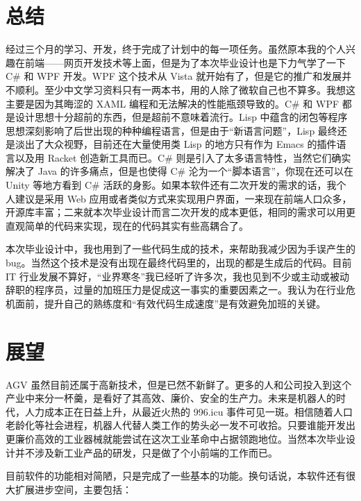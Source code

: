 
\section{总结}

经过三个月的学习、开发，终于完成了计划中的每一项任务。虽然原本我的个人兴趣在前端——网页开发技术等上面，但是为了本次毕业设计也是下力气学了一下 C\# 和 WPF 开发。WPF 这个技术从 Vista 就开始有了，但是它的推广和发展并不顺利。至少中文学习资料只有一两本书，用的人除了微软自己也不算多。我想这主要是因为其晦涩的 XAML 编程和无法解决的性能瓶颈导致的。C\# 和 WPF 都是设计思想十分超前的东西，但是超前不意味着流行。Lisp 中蕴含的闭包等程序思想深刻影响了后世出现的种种编程语言，但是由于``新语言问题''\cite{url:yinwang}，Lisp 最终还是淡出了大众视野，目前还在大量使用类 Lisp 的地方只有作为 Emacs 的插件语言以及用 Racket 创造新工具而已。C\# 则是引入了太多语言特性，当然它们确实解决了 Java 的许多痛点，但是也使得 C\# 沦为一个``脚本语言''，你现在还可以在 Unity 等地方看到 C\# 活跃的身影。如果本软件还有二次开发的需求的话，我个人建议是采用 Web 应用或者类似方式来实现用户界面，一来现在前端人口众多，开源库丰富；二来就本次毕业设计而言二次开发的成本更低，相同的需求可以用更直观简单的代码来实现，现在的代码其实有些高耦合了。

本次毕业设计中，我也用到了一些代码生成的技术，来帮助我减少因为手误产生的 bug。当然这个技术是没有出现在最终代码里的，出现的都是生成后的代码。目前 IT 行业发展不算好，``业界寒冬''我已经听了许多次，我也见到不少或主动或被动辞职的程序员，过量的加班压力是促成这一事实的重要因素之一。我认为在行业危机面前，提升自己的熟练度和``有效代码生成速度''是有效避免加班的关键。

\section{展望}

AGV 虽然目前还属于高新技术，但是已然不新鲜了。更多的人和公司投入到这个产业中来分一杯羹，是看好了其高效、廉价、安全的生产力。未来是机器人的时代，人力成本正在日益上升，从最近火热的 996.icu\cite{url:996icu} 事件可见一斑。相信随着人口老龄化等社会进程，机器人代替人类工作的势头必一发不可收拾。只要谁能开发出更廉价高效的工业器械就能尝试在这次工业革命中占据领跑地位。当然本次毕业设计并不涉及新工业产品的研发，只是做了个小前端的工作而已。

目前软件的功能相对简陋，只是完成了一些基本的功能。换句话说，本软件还有很大扩展进步空间，主要包括：

